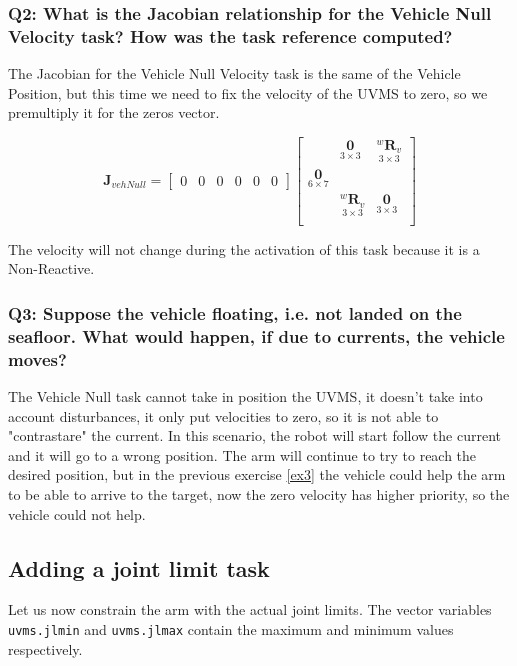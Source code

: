 \documentclass{article}
\newcommand{\ocio} {\marginpar{!}}
\begin{document}
\subsubsection{Q2: What is the Jacobian relationship for the Vehicle Null Velocity task? How was the task reference computed?}
The Jacobian for the Vehicle Null Velocity task is the same of the Vehicle Position, but this time we need to fix the velocity of the UVMS to zero, so we premultiply it for the zeros vector. %

\begin{equation}
\boldsymbol{J}_{vehNull}=\begin{bmatrix} 0 & 0 & 0 & 0 & 0 & 0
\end{bmatrix}
    \begin{bmatrix}
     & \underset{3\times 3}{\boldsymbol{0}} & \underset{ 3\times 3}{^{w}\boldsymbol{R}_{v}} \\
     \underset{6\times 7}{\boldsymbol{0}} \\
     & \underset{ 3\times 3}{^{w}\boldsymbol{R}_{v}} & \underset{3\times 3}{\boldsymbol{0}} \\
    \end{bmatrix}
\end{equation}

The velocity will not change during the activation of this task because it is a Non-Reactive.

\subsubsection{Q3: Suppose the vehicle floating, i.e. not landed on the seafloor. What would happen, if due to currents, the vehicle moves?}
The Vehicle Null task cannot take in position the UVMS, it doesn't take into account disturbances, it only put velocities to zero, so it is not able to "contrastare" the current. \ocio In this scenario, the robot will start follow the current and it will go to a wrong position. The arm will continue to try to reach the desired position, but in the previous exercise \ref{ex3} the vehicle could help the arm to be able to arrive to the target, now the zero velocity has higher priority, so the vehicle could not help. 
\clearpage

\subsection{Adding a joint limit task}
Let us now constrain the arm with the actual joint limits. The vector variables \texttt{uvms.jlmin} and \texttt{uvms.jlmax} contain the maximum and minimum values respectively.
\end{document}
